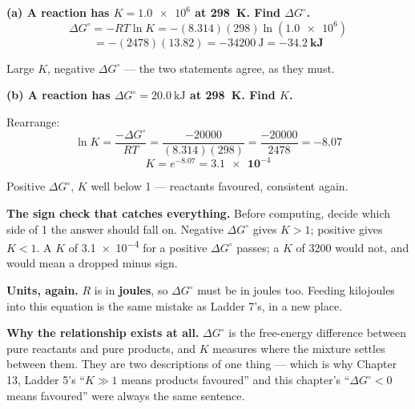 \documentclass{apchem-worksheet}
\begin{document}
\begin{center}
\end{center}

\begin{workedexample}
\textbf{(a) A reaction has $K = \num{1.0e6}$ at \SI{298}{\kelvin}. Find
$\Delta G^{\circ}$.}
\[ \Delta G^{\circ} = -RT \ln K
   = -(8.314)(298)\ln(\num{1.0e6}) \]
\[ = -(2478)(13.82) = \SI{-34200}{\joule}
   = \mathbf{\SI{-34.2}{\kilo\joule}} \]

Large $K$, negative $\Delta G^{\circ}$ --- the two statements agree, as
they must.

\textbf{(b) A reaction has $\Delta G^{\circ} =
\SI{+20.0}{\kilo\joule}$ at \SI{298}{\kelvin}. Find $K$.}

Rearrange:
\[ \ln K = \frac{-\Delta G^{\circ}}{RT}
         = \frac{-20000}{(8.314)(298)}
         = \frac{-20000}{2478} = -8.07 \]
\[ K = e^{-8.07} = \mathbf{\num{3.1e-4}} \]

Positive $\Delta G^{\circ}$, $K$ well below 1 --- reactants favoured,
consistent again.

\textbf{The sign check that catches everything.} Before computing,
decide which side of 1 the answer should fall on. Negative
$\Delta G^{\circ}$ gives $K > 1$; positive gives $K < 1$. A $K$ of
\num{3.1e-4} for a positive $\Delta G^{\circ}$ passes; a $K$ of 3200
would not, and would mean a dropped minus sign.

\textbf{Units, again.} $R$ is in \textbf{joules}, so $\Delta G^{\circ}$
must be in joules too. Feeding kilojoules into this equation is the same
mistake as Ladder 7's, in a new place.

\textbf{Why the relationship exists at all.} $\Delta G^{\circ}$ is the
free-energy difference between pure reactants and pure products, and $K$
measures where the mixture settles between them. They are two
descriptions of one thing --- which is why Chapter 13, Ladder 5's
``$K \gg 1$ means products favoured'' and this chapter's
``$\Delta G^{\circ} < 0$ means favoured'' were always the same
sentence.
\end{workedexample}
\end{document}
